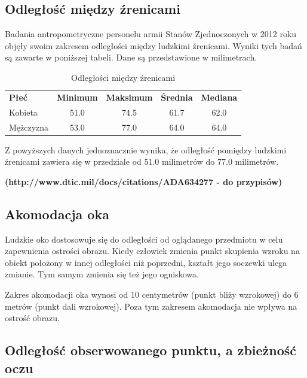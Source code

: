 \documentclass[a4paper,11pt,twoside]{report}
\theoremstyle{definition}
\begin{document}
\subsection {Odległość między źrenicami}

Badania antropometryczne personelu armii Stanów Zjednoczonych w 2012 roku objęły swoim zakresem odległości między ludzkimi źrenicami. Wyniki tych badań są zawarte w poniższej tabeli. Dane są przedstawione w milimetrach.

\begin{table}[!th]
\centering
\label{my-label}
\begin{tabular}{lcccc}
\textbf{Płeć} & \multicolumn{1}{l}{\textbf{Minimum}} & \multicolumn{1}{l}{\textbf{Maksimum}} & \multicolumn{1}{l}{\textbf{Średnia}} & \multicolumn{1}{l}{\textbf{Mediana}} \\
Kobieta       & 51.0                                 & 74.5                                  & 61.7                                 & 62.0                                 \\
Mężczyzna     & 53.0                                 & 77.0                                  & 64.0                                 & 64.0                                
\end{tabular}
\caption{Odległości między źrenicami}
\end{table}

Z powyższych danych jednoznacznie wynika, że odległość pomiędzy ludzkimi źrenicami zawiera się w przedziale od 51.0 milimetrów do 77.0 milimetrów.

\textbf{(http://www.dtic.mil/docs/citations/ADA634277 - do przypisów)}

\subsection {Akomodacja oka}

Ludzkie oko dostosowuje się do odległości od oglądanego przedmiotu w celu zapewnienia ostrości obrazu. Kiedy człowiek zmienia punkt skupienia wzroku na obiekt położony w innej odległości niż poprzedni, kształt jego soczewki ulega zmianie. Tym samym zmienia się też jego ogniskowa. 

Zakres akomodacji oka wynosi od 10 centymetrów (punkt bliży wzrokowej) do 6 metrów (punkt dali wzrokowej). Poza tym zakresem akomodacja nie wpływa na ostrość obrazu.

\subsection {Odległość obserwowanego punktu, a zbieżność oczu}
\end{document}
